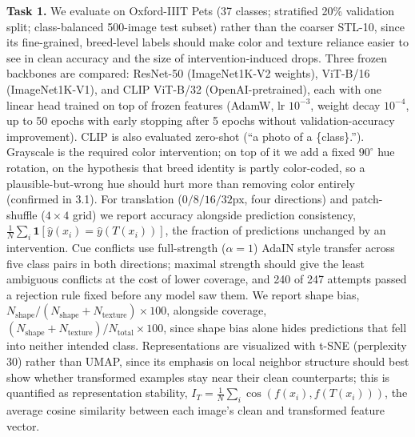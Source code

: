 \documentclass{article}
\begin{document}
\textbf{Task 1.} We evaluate on Oxford-IIIT Pets (37 classes; stratified 20\% validation split;
class-balanced 500-image test subset) rather than the coarser STL-10, since its fine-grained,
breed-level labels should make color and texture reliance easier to see in clean accuracy and the
size of intervention-induced drops. Three frozen backbones are compared: ResNet-50
\cite{he2016resnet} (ImageNet1K-V2 weights), ViT-B/16 \cite{dosovitskiy2021vit} (ImageNet1K-V1),
and CLIP ViT-B/32 \cite{radford2021clip} (OpenAI-pretrained), each with one linear head trained on
top of frozen features (AdamW, lr $10^{-3}$, weight decay $10^{-4}$, up to 50 epochs with early
stopping after 5 epochs without validation-accuracy improvement). CLIP is also evaluated zero-shot
(``a photo of a \{class\}.''). Grayscale is the required color intervention; on top of it we add a
fixed $90^\circ$ hue rotation, on the hypothesis that breed identity is partly color-coded, so a
plausible-but-wrong hue should hurt more than removing color entirely (confirmed in 3.1). For
translation ($0/8/16/32$px, four directions) and patch-shuffle ($4\times4$ grid) we report accuracy
alongside prediction consistency, $\frac{1}{N}\sum_i\mathbf{1}[\hat y(x_i){=}\hat y(T(x_i))]$, the
fraction of predictions unchanged by an intervention. Cue conflicts use full-strength ($\alpha=1$)
AdaIN style transfer \cite{huang2017adain} across five class pairs in both directions; maximal
strength should give the least ambiguous conflicts at the cost of lower coverage, and 240 of 247
attempts passed a rejection rule fixed before any model saw them. We report shape bias,
$N_{\mathrm{shape}}/(N_{\mathrm{shape}}{+}N_{\mathrm{texture}}){\times}100$, alongside coverage,
$(N_{\mathrm{shape}}{+}N_{\mathrm{texture}})/N_{\mathrm{total}}{\times}100$, since shape bias alone
hides predictions that fell into neither intended class. Representations are visualized with t-SNE
(perplexity 30) rather than UMAP, since its emphasis on local neighbor structure should best show
whether transformed examples stay near their clean counterparts; this is quantified as
representation stability, $I_T=\frac{1}{N}\sum_i\cos(f(x_i),f(T(x_i)))$, the average cosine
similarity between each image's clean and transformed feature vector.
\end{document}

